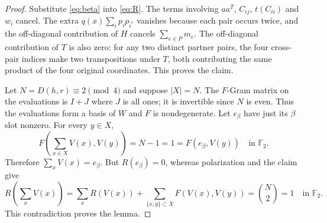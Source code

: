 \documentclass[11pt]{article}
\newcommand{\F}{\mathbb F_2}
\begin{document}
\begin{proof}
Substitute \eqref{eq:beta} into \eqref{eq:R}. The terms involving $aa^T$, $C_{ij}$, $t(C_{ii})$ and $w_i$ cancel. The extra $q(x)\sum_i p_i p_{i^*}$ vanishes because each pair occurs twice, and the off-diagonal contribution of $H$ cancels $\sum_{e\in P}m_e$. The off-diagonal contribution of $T$ is also zero: for any two distinct partner pairs, the four cross-pair indices make two transpositions under $T$, both contributing the same product of the four original coordinates. This proves the claim.

Let $N=D(h,r)\equiv2\pmod4$ and suppose $|X|=N$. The $F$-Gram matrix on the evaluations is $I+J$ where $J$ is all ones; it is invertible since $N$ is even. Thus the evaluations form a basis of $W$ and $F$ is nondegenerate. Let $e_\beta$ have just its $\beta$ slot nonzero. For every $y\in X$,
\[
 F\left(\sum_{x\in X}V(x),V(y)\right)=N-1=1=F(e_\beta,V(y))\quad\text{in }\F.
\]
Therefore $\sum_x V(x)=e_\beta$. But $R(e_\beta)=0$, whereas polarization and the claim give
\[
 R\left(\sum_x V(x)\right)=\sum_x R(V(x))+\sum_{\{x,y\}\subset X}F(V(x),V(y))
 =\binom N2=1\quad\text{in }\F.
\]
This contradiction proves the lemma.
\end{proof}
\end{document}
